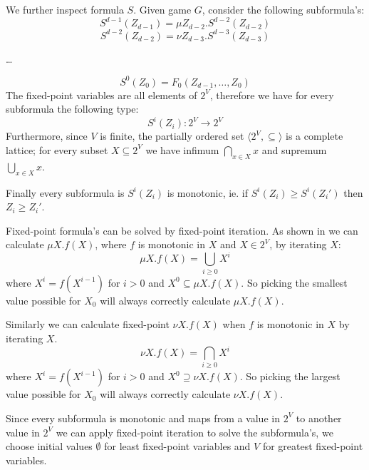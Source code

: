 We further inspect formula $S$. Given game $G$, consider the following subformula's:
\[ S^{d-1}(Z_{d-1}) = \mu Z_{d-2}.S^{d-2}(Z_{d-2})\]
\[ S^{d-2}(Z_{d-2}) = \nu Z_{d-3}.S^{d-3}(Z_{d-3})\]
\begin{center}
	\dots
\end{center}
\[ S^{0}(Z_0) = F_0(Z_{d-1},\dots,Z_0)\]
The fixed-point variables are all elements of $2^V$, therefore we have for every subformula the following type:
\[ S^i(Z_i) : 2^V \rightarrow 2^V \]
Furthermore, since $V$ is finite, the partially ordered set $\langle 2^V, \subseteq \rangle$ is a complete lattice; for every subset $X \subseteq 2^V$ we have infimum $\bigcap_{x \in X} x$ and supremum $\bigcup_{x \in X} x$.

Finally every subformula is $S^i(Z_i)$ is monotonic, ie. if $S^i(Z_i) \geq S^i(Z_i')$ then $Z_i \geq Z_i'$.

Fixed-point formula's can be solved by fixed-point iteration. As shown in \cite{Emerson:1986:MCP:900378} we can calculate $\mu X.f(X)$, where $f$ is monotonic in $X$ and $X \in 2^V$, by iterating $X$:
\[ \mu X.f(X) = \bigcup_{i \geq 0} X^i \]
where $X^i = f(X^{i-1})$ for $i > 0$ and $X^0 \subseteq \mu X.f(X)$. So picking the smallest value possible for $X_0$ will always correctly calculate $\mu X. f(X)$.

Similarly we can calculate fixed-point $\nu X.f(X)$ when $f$ is monotonic in $X$ by iterating $X$.
\[ \nu X.f(X) = \bigcap_{i \geq 0} X^i \]
where $X^i = f(X^{i-1})$ for $i > 0$ and $X^0 \supseteq \nu X.f(X)$. So picking the largest value possible for $X_0$ will always correctly calculate $\nu X. f(X)$.

Since every subformula is monotonic and maps from a value in $2^V$ to another value in $2^V$ we can apply fixed-point iteration to solve the subformula's, we choose initial values $\emptyset$ for least fixed-point variables and $V$ for greatest fixed-point variables.


